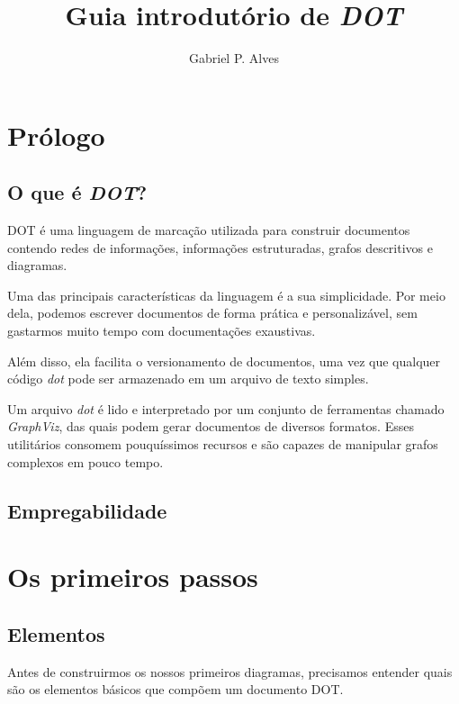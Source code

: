 \documentclass[a4paper,12pt]{article}
\begin{document}
  \title{\vspace{-1.5in} Guia introdutório de \emph{DOT}}
  \author{Gabriel P. Alves}
  \date{}
  \maketitle

  \section{Prólogo}

    \subsection{O que é \emph{DOT}?}
      DOT é uma linguagem de marcação
      utilizada para construir documentos
      contendo redes de informações,
      informações estruturadas, grafos
      descritivos e diagramas.

      Uma das principais características da
      linguagem é a sua simplicidade. Por
      meio dela, podemos escrever
      documentos de forma prática e
      personalizável, sem gastarmos muito
      tempo com documentações exaustivas.

      Além disso, ela facilita o
      versionamento de documentos, uma vez
      que qualquer código \emph{dot} pode ser
      armazenado em um arquivo de
      texto simples.

      Um arquivo \emph{dot} é lido e
      interpretado por um conjunto de
      ferramentas chamado \emph{GraphViz},
      das quais podem gerar documentos de
      diversos formatos. Esses utilitários
      consomem pouquíssimos recursos e são
      capazes de manipular grafos complexos
      em pouco tempo.

    \subsection{Empregabilidade}
    \break

  \section{Os primeiros passos}

    \subsection{Elementos}
      Antes de construirmos os nossos primeiros diagramas,
      precisamos entender quais são os elementos básicos
      que compõem um documento DOT.
\end{document}

